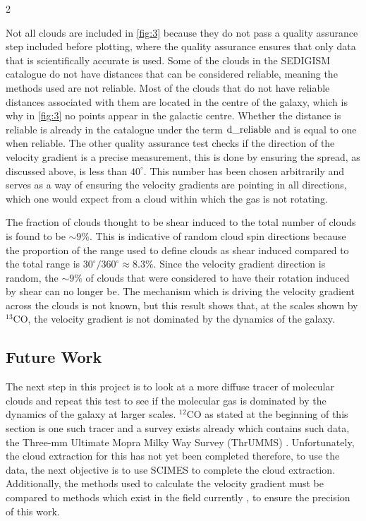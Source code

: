\documentclass[a4paper,11pt]{article}
\begin{document}
\begin{multicols}{2}
\par\noindent Not all clouds are included in \autoref{fig:3} because they do not pass a quality assurance step included before plotting, where the quality assurance ensures that only data that is scientifically accurate is used. Some of the clouds in the SEDIGISM catalogue do not have distances that can be considered reliable, meaning the methods used are not reliable. Most of the clouds that do not have reliable distances associated with them are located in the centre of the galaxy, which is why in \autoref{fig:3} no points appear in the galactic centre. Whether the distance is reliable is already in the catalogue under the term $\text{d\textunderscore{}reliable}$ and is equal to one when reliable. The other quality assurance test checks if the direction of the velocity gradient is a precise measurement, this is done by ensuring the spread, as discussed above, is less than $40^{\circ}$. This number has been chosen arbitrarily and serves as a way of ensuring the velocity gradients are pointing in all directions, which one would expect from a cloud within which the gas is not rotating.
\smallskip
\par\noindent The fraction of clouds thought to be shear induced to the total number of clouds is found to be $\sim9\%$. This is indicative of random cloud spin directions because the proportion of the range used to define clouds as shear induced compared to the total range is $30^{\circ}/360^{\circ}\approx8.3\%$. Since the velocity gradient direction is random, the $\sim9\%$ of clouds that were considered to have their rotation induced by shear can no longer be. The mechanism which is driving the velocity gradient across the clouds is not known, but this result shows that, at the scales shown by $^{13}$CO, the velocity gradient is not dominated by the dynamics of the galaxy.

\subsection*{Future Work}

\par\noindent The next step in this project is to look at a more diffuse tracer of molecular clouds and repeat this test to see if the molecular gas is dominated by the dynamics of the galaxy at larger scales. $^{12}$CO as stated at the beginning of this section is one such tracer and a survey exists already which contains such data, the Three-mm Ultimate Mopra Milky Way Survey (ThrUMMS) \parencite{ThrUMMS}. Unfortunately, the cloud extraction for this has not yet been completed therefore, to use the data, the next objective is to use SCIMES \parencite{SCIMES} to complete the cloud extraction. Additionally, the methods used to calculate the velocity gradient must be compared to methods which exist in the field currently \parencite{Gradient_method}, to ensure the precision of this work. 


\end{multicols}
\end{document}
